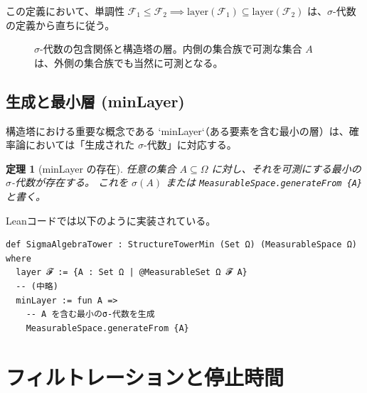 \documentclass[a4paper,11pt]{article}
\theoremstyle{definition}
\theoremstyle{plain}
\newtheorem{theorem}[definition]{定理}
\begin{document}
この定義において、単調性 $\mathcal{F}_1 \le \mathcal{F}_2 \implies \mathrm{layer}(\mathcal{F}_1) \subseteq \mathrm{layer}(\mathcal{F}_2)$ は、$\sigma$-代数の定義から直ちに従う。

\begin{figure}[htbp]
\centering
{}
\caption{$\sigma$-代数の包含関係と構造塔の層。内側の集合族で可測な集合 $A$ は、外側の集合族でも当然に可測となる。}
\end{figure}

\subsection{生成と最小層 (minLayer)}
構造塔における重要な概念である `minLayer`（ある要素を含む最小の層）は、確率論においては「生成された $\sigma$-代数」に対応する。

\begin{theorem}[minLayer の存在]
任意の集合 $A \subseteq \Omega$ に対し、それを可測にする最小の $\sigma$-代数が存在する。
これを $\sigma(A)$ または \texttt{MeasurableSpace.generateFrom \{A\}} と書く。
\end{theorem}

Leanコードでは以下のように実装されている。

\begin{lstlisting}[caption=SigmaAlgebraTowerの実装]
def SigmaAlgebraTower : StructureTowerMin (Set Ω) (MeasurableSpace Ω) where
  layer 𝓕 := {A : Set Ω | @MeasurableSet Ω 𝓕 A}
  -- (中略)
  minLayer := fun A =>
    -- A を含む最小のσ-代数を生成
    MeasurableSpace.generateFrom {A}
\end{lstlisting}

\section{フィルトレーションと停止時間}
\end{document}
